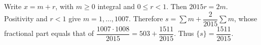 Write $ x=m+r $, with $ m\ge0 $ integral and $ 0\le r<1 $. Then $ 2015r=2m $. Positivity and $ r<1 $ give $ m=1,\ldots,1007 $. Therefore $ s=\sum m+\dfrac{2}{2015}\sum m $, whose fractional part equals that of $\dfrac{1007\cdot1008}{2015}=503+\dfrac{1511}{2015}$. Thus $\boxed{\{s\}=\dfrac{1511}{2015}}$.
